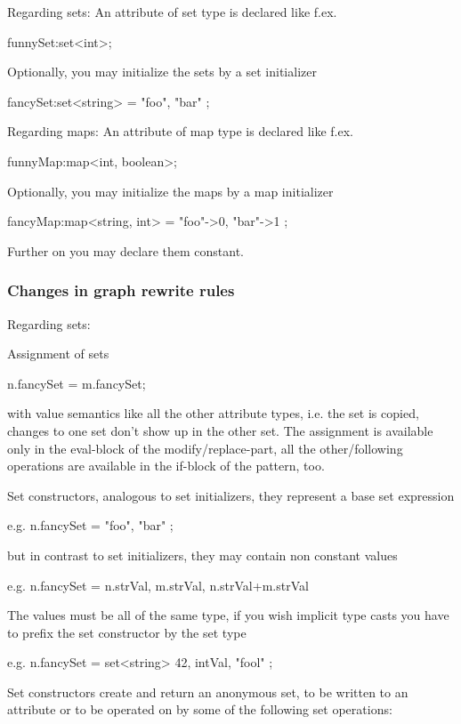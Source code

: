 Regarding sets:
An attribute of set type is declared like f.ex.
\begin{grgenlet} funnySet:set<int>; \end{grgenlet}
Optionally, you may initialize the sets by a set initializer
\begin{grgenlet} fancySet:set<string> = { "foo", "bar" }; \end{grgenlet}

Regarding maps:
An attribute of map type is declared like f.ex.
\begin{grgenlet} funnyMap:map<int, boolean>; \end{grgenlet}
Optionally, you may initialize the maps by a map initializer
\begin{grgenlet} fancyMap:map<string, int> = { "foo"->0, "bar"->1 }; \end{grgenlet}

Further on you may declare them constant.

\subsubsection{Changes in graph rewrite rules}

Regarding sets:

Assignment of sets
\begin{grgenlet} n.fancySet = m.fancySet; \end{grgenlet}
with value semantics like all the other attribute types, 
i.e. the set is copied, changes to one set don't show up in the other set.
The assignment is available only in the eval-block of the modify/replace-part, 
all the other/following operations are available in the if-block of the pattern, too.

Set constructors, analogous to set initializers, they represent a base set expression
\begin{grgenlet} e.g. n.fancySet = { "foo", "bar" }; \end{grgenlet}
but in contrast to set initializers, they may contain non constant values
\begin{grgenlet} e.g. n.fancySet = { n.strVal, m.strVal, n.strVal+m.strVal } \end{grgenlet}
The values must be all of the same type, if you wish implicit type casts
you have to prefix the set constructor by the set type
\begin{grgenlet} e.g. n.fancySet = set<string>{ 42, intVal, "fool" }; \end{grgenlet}
Set constructors create and return an anonymous set,
to be written to an attribute or to be operated on by some of the following set operations:

